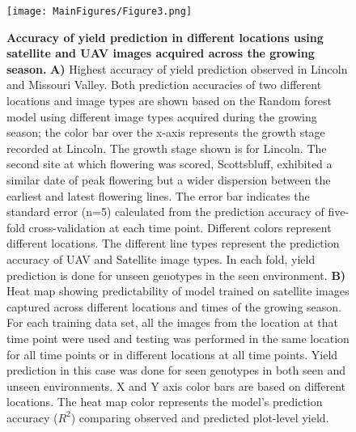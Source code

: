 \documentclass[12pt,twoside]{gsag3jnl}
\begin{document}
\begin{figure}[h]
    \centering
    \texttt{[image: MainFigures/Figure3.png]}
    \caption{\textbf{Accuracy of yield prediction in different locations using satellite and UAV images acquired across the growing season.} \textbf{A)} Highest accuracy of yield prediction observed in Lincoln and Missouri Valley. Both prediction accuracies of two different locations and image types are shown based on the Random forest model using different image types acquired during the growing season; the color bar over the x-axis represents the growth stage recorded at Lincoln. The growth stage shown is for Lincoln. The second site at which flowering was scored, Scottsbluff, exhibited a similar date of peak flowering but a wider dispersion between the earliest and latest flowering lines. The error bar indicates the standard error (n=5) calculated from the prediction accuracy of five-fold cross-validation at each time point. Different colors represent different locations. The different line types represent the prediction accuracy of UAV and Satellite image types. In each fold, yield prediction is done for unseen genotypes in the seen environment. \textbf{B)} Heat map showing predictability of model trained on satellite images captured across different locations and times of the growing season. For each training data set, all the images from the location at that time point were used and testing was performed in the same location for all time points or in different locations at all time points. Yield prediction in this case was done for seen genotypes in both seen and unseen environments. X and Y axis color bars are based on different locations. The heat map color represents the model's prediction accuracy ($R^2$) comparing observed and predicted plot-level yield.
    }
    \label{fig:Figure3}
\end{figure}

\setcounter{table}{0}
\setcounter{figure}{0}
\renewcommand{\thetable}{S\arabic{table}}
\renewcommand{\thefigure}{S\arabic{figure}}
\end{document}
